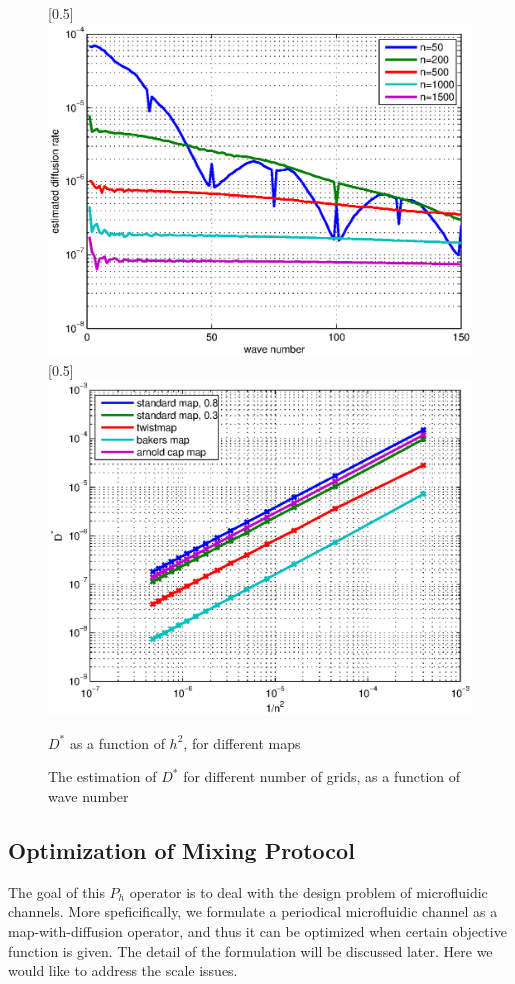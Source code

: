 \begin{figure}
\centerline{\scalebox{0.5}[0.5]{\includegraphics{estimateddiffusionrate.eps}}
            \scalebox{0.5}[0.5]{\includegraphics{ndchart.eps}}}
\caption{\label{ndchart} $D^*$ as a function of $h^2$, for
different maps } \caption{\label{estimateddiffusionrate} The
estimation of $D^*$ for different number of grids, as a function of
wave number}
\end{figure}

\subsection{Optimization of Mixing Protocol}
The goal of this $P_h$ operator is to deal with the design problem of microfluidic channels.
More speficifically, we formulate a periodical microfluidic channel as a map-with-diffusion
operator, and thus it can be optimized when certain objective function is given. The detail
of the formulation will be discussed later. Here we would like to address the scale issues.

